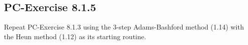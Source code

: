 \documentclass[a4paper,dvipdfmx]{jsarticle}
\newlength{\cellleftmargin}
\newlength{\smallerfontscale}
\def\smaller{\fontsize{\smallerfontscale}{\smallerfontscale}\selectfont}
\begin{document}
\par\vspace{1\smallerfontscale}%
    \begin{addmargin}[\cellleftmargin]{0em}%
    {\smaller%
    \vspace{-1\smallerfontscale}%
    
    \begin{center}
    \end{center}
    { \hspace*{\fill} \\}
    }%
    \end{addmargin}%
    \begin{addmargin}[\cellleftmargin]{0em}%
    {\smaller%
    \vspace{-1\smallerfontscale}%
    
    \begin{center}
    \end{center}
    { \hspace*{\fill} \\}
    }%
    \end{addmargin}%
    \subsection{PC-Exercise 8.1.5}\label{pc-exercise-8.1.5}

Repeat PC-Exercise 8.1.3 using the 3-step Adams-Bashford method (1.14)
with the Heun method (1.12) as its starting routine.

\end{document}
